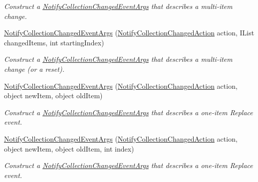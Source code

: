 \begin{DoxyCompactItemize}
\begin{DoxyCompactList}\small\item\em Construct a \hyperlink{class_system_1_1_collections_1_1_specialized_1_1_notify_collection_changed_event_args}{Notify\+Collection\+Changed\+Event\+Args} that describes a multi-\/item change. \end{DoxyCompactList}\item 
\hyperlink{class_system_1_1_collections_1_1_specialized_1_1_notify_collection_changed_event_args_a79327bb7bf3756166405b8f69ad73cc2}{Notify\+Collection\+Changed\+Event\+Args} (\hyperlink{namespace_system_1_1_collections_1_1_specialized_a7e21ea761562ed22011c3120bbb31123}{Notify\+Collection\+Changed\+Action} action, I\+List changed\+Items, int starting\+Index)
\begin{DoxyCompactList}\small\item\em Construct a \hyperlink{class_system_1_1_collections_1_1_specialized_1_1_notify_collection_changed_event_args}{Notify\+Collection\+Changed\+Event\+Args} that describes a multi-\/item change (or a reset). \end{DoxyCompactList}\item 
\hyperlink{class_system_1_1_collections_1_1_specialized_1_1_notify_collection_changed_event_args_a672c476f479b466ae7add7ed60171633}{Notify\+Collection\+Changed\+Event\+Args} (\hyperlink{namespace_system_1_1_collections_1_1_specialized_a7e21ea761562ed22011c3120bbb31123}{Notify\+Collection\+Changed\+Action} action, object new\+Item, object old\+Item)
\begin{DoxyCompactList}\small\item\em Construct a \hyperlink{class_system_1_1_collections_1_1_specialized_1_1_notify_collection_changed_event_args}{Notify\+Collection\+Changed\+Event\+Args} that describes a one-\/item Replace event. \end{DoxyCompactList}\item 
\hyperlink{class_system_1_1_collections_1_1_specialized_1_1_notify_collection_changed_event_args_abe7161dc8bc3802c3defcb131af3d663}{Notify\+Collection\+Changed\+Event\+Args} (\hyperlink{namespace_system_1_1_collections_1_1_specialized_a7e21ea761562ed22011c3120bbb31123}{Notify\+Collection\+Changed\+Action} action, object new\+Item, object old\+Item, int index)
\begin{DoxyCompactList}\small\item\em Construct a \hyperlink{class_system_1_1_collections_1_1_specialized_1_1_notify_collection_changed_event_args}{Notify\+Collection\+Changed\+Event\+Args} that describes a one-\/item Replace event. \end{DoxyCompactList}\item 

\end{DoxyCompactItemize}
